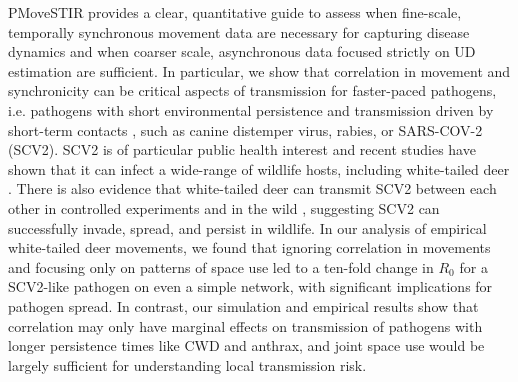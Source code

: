 \documentclass[letterpaper]{article}
\begin{document}
PMoveSTIR provides a clear, quantitative guide to assess when fine-scale, temporally synchronous movement data are necessary for capturing disease dynamics and when coarser scale, asynchronous data focused strictly on UD estimation are sufficient. 
In particular, we show that correlation in movement and synchronicity can be critical aspects of transmission for faster-paced pathogens, i.e. pathogens with short environmental persistence and transmission driven by short-term contacts \citep[cf.][]{Dougherty2018,Manlove2022}, such as canine distemper virus, rabies, or SARS-COV-2 (SCV2). 
SCV2 is of particular public health interest and recent studies have shown that it can infect a wide-range of wildlife hosts, including white-tailed deer \citep{Palmer2021,Hale2022}. There is also evidence that white-tailed deer can transmit SCV2 between each other in controlled experiments and in the wild \citep{Martins2022,Hale2022}, suggesting SCV2 can successfully invade, spread, and persist in wildlife.  In our analysis of empirical white-tailed deer movements, we found that ignoring correlation in movements and focusing only on patterns of space use led to a ten-fold change in $R_0$ for a SCV2-like pathogen on even a simple network, with significant implications for pathogen spread.  In contrast, our simulation and empirical results show that correlation may only have marginal effects on transmission of pathogens with longer persistence times like CWD and anthrax, and joint space use would be largely sufficient for understanding local transmission risk.


\end{document}
